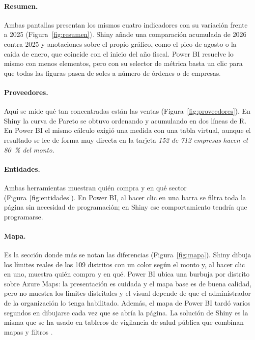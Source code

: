 \documentclass[12pt,a4paper]{article}
\begin{document}
\paragraph{Resumen.} Ambas pantallas presentan los mismos cuatro indicadores con su variación frente a
2025 (Figura~\ref{fig:resumen}). Shiny añade una comparación acumulada de 2026 contra 2025 y anotaciones
sobre el propio gráfico, como el pico de agosto o la caída de enero, que coincide con el inicio del año
fiscal. Power BI resuelve lo mismo con menos elementos, pero con su selector de métrica basta un clic para
que todas las figuras pasen de soles a número de órdenes o de empresas.

\paragraph{Proveedores.} Aquí se mide qué tan concentradas están las ventas (Figura~\ref{fig:proveedores}).
En Shiny la curva de Pareto se obtuvo ordenando y acumulando en dos líneas de R. En Power BI el mismo cálculo
exigió una medida con una tabla virtual, aunque el resultado se lee de forma muy directa en la tarjeta
\emph{152 de 712 empresas hacen el 80~\% del monto}.

\paragraph{Entidades.} Ambas herramientas muestran quién compra y en qué sector
(Figura~\ref{fig:entidades}). En Power BI, al hacer clic en una barra se filtra toda la página sin necesidad de
programación; en Shiny ese comportamiento tendría que programarse.

\paragraph{Mapa.} Es la sección donde más se notan las diferencias (Figura~\ref{fig:mapa}). Shiny dibuja los
límites reales de los 109 distritos con un color según el monto y, al hacer clic en uno, muestra quién
compra y en qué. Power BI ubica una burbuja por distrito sobre Azure Maps: la presentación es cuidada y el mapa
base es de buena calidad, pero no muestra los límites distritales y el visual depende de que el administrador de la
organización lo tenga habilitado. Además, el mapa de Power BI tardó varios segundos en dibujarse cada vez
que se abría la página. La solución de Shiny es la misma que se ha usado en tableros de vigilancia de salud
pública que combinan mapas y filtros \citep{lu2026}.
\end{document}
